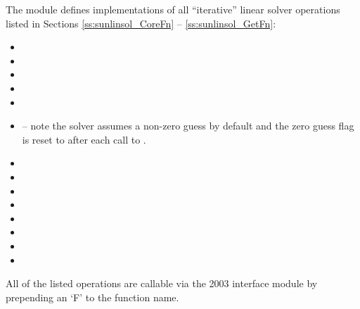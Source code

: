 %
The {\sunlinsolsptfqmr} module defines implementations of all
``iterative'' linear solver operations listed in Sections
\ref{ss:sunlinsol_CoreFn} -- \ref{ss:sunlinsol_GetFn}:
\begin{itemize}
\item {}
\item {}
\item {}
\item {}
\item {}
\item {} -- note the solver assumes a non-zero
  guess by default and the zero guess flag is reset to  after each
  call to .
\item {}
\item {}
\item {}
\item {}
\item {}
\item {}
\item {}
\item {}
\end{itemize}
All of the listed operations are callable via the {\F} 2003 interface module
by prepending an `F' to the function name.


